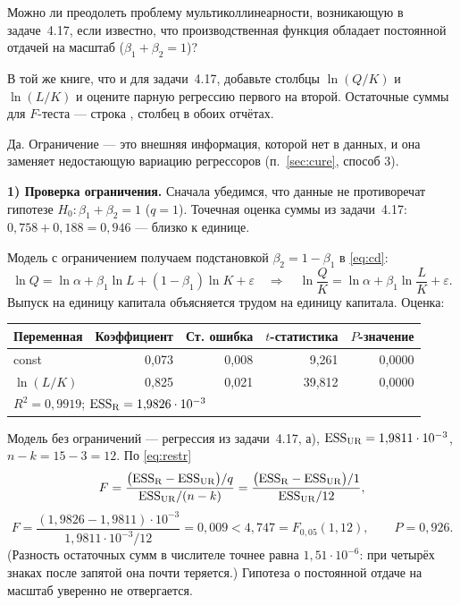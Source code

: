 
Можно ли преодолеть проблему мультиколлинеарности, возникающую в
задаче~4.17, если известно, что производственная функция обладает постоянной
отдачей на масштаб ($\beta_1 + \beta_2 = 1$)?

\begin{excel}
В той же книге, что и для задачи~4.17, добавьте столбцы $\ln(Q/K)$ и
$\ln(L/K)$ и оцените парную регрессию первого на второй. Остаточные суммы для
$F$-теста — строка , столбец  в обоих отчётах.
\end{excel}

\begin{solution}
Да. Ограничение — это внешняя информация, которой нет в данных, и она
заменяет недостающую вариацию регрессоров (п.~\ref{sec:cure}, способ 3).

\medskip
\textbf{1) Проверка ограничения.} Сначала убедимся, что данные не
противоречат гипотезе $H_0\colon \beta_1 + \beta_2 = 1$ ($q = 1$). Точечная
оценка суммы из задачи~4.17: $0{,}758 + 0{,}188 = 0{,}946$ — близко к единице.

Модель с ограничением получаем подстановкой $\beta_2 = 1 - \beta_1$ в
\eqref{eq:cd}:
\[
  \ln Q = \ln\alpha + \beta_1\ln L + (1 - \beta_1)\ln K + \varepsilon
  \quad\Longrightarrow\quad
  \ln\frac{Q}{K} = \ln\alpha + \beta_1\ln\frac{L}{K} + \varepsilon .
\]
Выпуск на единицу капитала объясняется трудом на единицу капитала. Оценка:
\begin{center}
\begin{tabular}{lrrrr}
\toprule
Переменная & Коэффициент & Ст. ошибка & $t$-статистика & $P$-значение \\
\midrule
const       & 0,073 & 0,008 & \phantom{0}9,261 & 0,0000 \\
$\ln(L/K)$  & 0,825 & 0,021 & 39,812 & 0,0000 \\
\midrule
\multicolumn{5}{l}{$R^2 = 0{,}9919$;\quad
  $\mathrm{ESS}_{\mathrm{R}} = 1{,}9826\cdot 10^{-3}$} \\
\bottomrule
\end{tabular}
\end{center}
Модель без ограничений — регрессия из задачи~4.17, а),
$\mathrm{ESS}_{\mathrm{UR}} = 1{,}9811\cdot 10^{-3}$, $n - k = 15 - 3 = 12$. По
\eqref{eq:restr}
\[
  F = \frac{\bigl(\mathrm{ESS}_{\mathrm{R}} - \mathrm{ESS}_{\mathrm{UR}}\bigr)/q}
           {\mathrm{ESS}_{\mathrm{UR}}/(n-k)}
    = \frac{\bigl(\mathrm{ESS}_{\mathrm{R}} - \mathrm{ESS}_{\mathrm{UR}}\bigr)/1}
           {\mathrm{ESS}_{\mathrm{UR}}/12},
\]
\[
  F = \frac{(1{,}9826 - 1{,}9811)\cdot 10^{-3}}{1{,}9811\cdot 10^{-3}/12}
    = 0{,}009 < 4{,}747 = F_{0{,}05}(1, 12),
  \qquad P = 0{,}926 .
\]
(Разность остаточных сумм в числителе точнее равна $1{,}51\cdot 10^{-6}$: при
четырёх знаках после запятой она почти теряется.) Гипотеза о постоянной отдаче
на масштаб уверенно не отвергается.


\end{solution}

